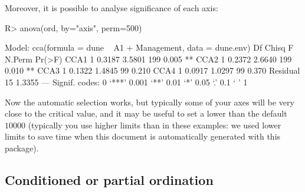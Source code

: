\documentclass[article,nojss]{jss}
\begin{document}
Moreover, it is possible to analyse significance of each axis:
\begin{Schunk}
\begin{Sinput}
R> anova(ord, by="axis", perm=500)
\end{Sinput}
\begin{Soutput}
Model: cca(formula = dune ~ A1 + Management, data = dune.env)
         Df  Chisq      F N.Perm Pr(>F)   
CCA1      1 0.3187 3.5801    199  0.005 **
CCA2      1 0.2372 2.6640    199  0.010 **
CCA3      1 0.1322 1.4845     99  0.210   
CCA4      1 0.0917 1.0297     99  0.370   
Residual 15 1.3355                        
---
Signif. codes:  0 ‘***’ 0.001 ‘**’ 0.01 ‘*’ 0.05 ‘.’ 0.1 ‘ ’ 1
\end{Soutput}
\end{Schunk}
Now the automatic selection works, but typically some of your axes
will be very close to the critical value, and it may be useful to set
a lower  than the default $10000$ (typically you use
higher limits than in these examples: we used lower limits to save
time when this document is automatically generated with this package).

\subsection{Conditioned or partial ordination}
\end{document}
